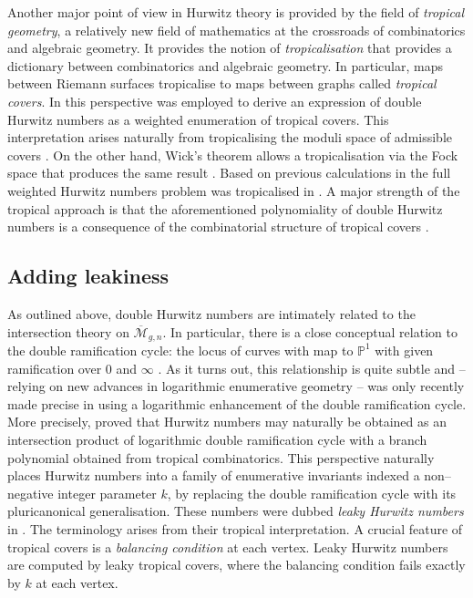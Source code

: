 \documentclass[10pt,a4paper,oneside,no-math,reqno]{amsart}%
\theoremstyle{plain}
\theoremstyle{definition}
\theoremstyle{remark}
\numberwithin{equation}{section}
\newcommand{\mb}[1]{\mathbb{#1}}
\newcommand{\1}{\mathds{1}}
\renewcommand{\P}{\mb{P}}
\newcommand{\<}{\langle}
\renewcommand{\>}{\rangle}
\begin{document}
Another major point of view in Hurwitz theory is provided by the field of \emph{tropical geometry}, a relatively new field of mathematics at the crossroads of combinatorics and algebraic geometry. It provides the notion of \emph{tropicalisation} that provides a dictionary between combinatorics and algebraic geometry. In particular, maps between Riemann surfaces tropicalise to maps between graphs called \emph{tropical covers}. In \cite{CJM10} this perspective was employed to derive an expression of double Hurwitz numbers as a weighted enumeration of tropical covers. This interpretation arises naturally from tropicalising the moduli space of admissible covers \cite{cavalieri2016tropicalizing}. On the other hand, Wick's theorem allows a tropicalisation via the Fock space that produces the same result \cite{zbMATH07272609}. Based on previous calculations in \cite{HL22,HL20} the full weighted Hurwitz numbers problem was tropicalised in \cite{hahn2025tropicalising}. A major strength of the tropical approach is that the aforementioned polynomiality of double Hurwitz numbers is a consequence of the combinatorial structure of tropical covers \cite{CJM11}.


\subsection{Adding leakiness}
As outlined above, double Hurwitz numbers are intimately related to the intersection theory on $\overline{\mathcal{M}}_{g,n}$. In particular, there is a close conceptual relation to the double ramification cycle:  the locus of curves with map to $ \P^1$ with given ramification over $ 0$ and $ \infty$ \cite{GV05}. As it turns out, this relationship is quite subtle and -- relying on new advances in logarithmic enumerative geometry \cite{HPS19} -- was only recently made precise in \cite{CMR25} using a logarithmic enhancement of the double ramification cycle. More precisely, \cite{CMR25} proved that Hurwitz numbers may naturally be obtained as an intersection product of logarithmic double ramification cycle with a branch polynomial obtained from tropical combinatorics. This perspective naturally places Hurwitz numbers into a family of enumerative invariants indexed a non--negative integer parameter $k$, by replacing the double ramification cycle with its pluricanonical generalisation. These numbers were dubbed \emph{leaky Hurwitz numbers} in \cite{CMR25}. The terminology arises from their tropical interpretation. A crucial feature of tropical covers is a \emph{balancing condition} at each vertex. Leaky Hurwitz numbers are computed by leaky tropical covers, where the balancing condition fails exactly by $k$ at each vertex.
\end{document}
